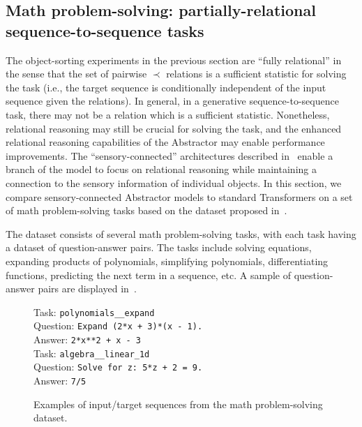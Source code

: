\subsection{Math problem-solving: partially-relational sequence-to-sequence tasks}\label{ssec:experiments_math}

The object-sorting experiments in the previous section are ``fully relational'' in the sense that the set of pairwise $\prec$ relations is a sufficient statistic for solving the task (i.e., the target sequence is conditionally independent of the input sequence given the relations). In general, in a generative sequence-to-sequence task, there may not be a relation which is a sufficient statistic. Nonetheless, relational reasoning may still be crucial for solving the task, and the enhanced relational reasoning capabilities of the Abstractor may enable performance improvements. The ``sensory-connected'' architectures described in~ enable a branch of the model to focus on relational reasoning while maintaining a connection to the sensory information of individual objects. In this section, we compare sensory-connected Abstractor models to standard Transformers on a set of math problem-solving tasks based on the dataset proposed in~\citep{saxtonAnalyzingMathematicalReasoning2019}.

The dataset consists of several math problem-solving tasks, with each task having a dataset of question-answer pairs. The tasks include solving equations, expanding products of polynomials, simplifying polynomials, differentiating functions, predicting the next term in a sequence, etc. A sample of question-answer pairs are displayed in~.

\begin{figure}
    \begin{minipage}{0.5\textwidth}
        Task: \texttt{polynomials\_\_expand}\\
        Question: \texttt{Expand (2*x + 3)*(x - 1).}\\
        Answer: \texttt{2*x**2 + x - 3}\\

        Task: \texttt{algebra\_\_linear\_1d}\\
        Question: \texttt{Solve for z: 5*z + 2 = 9.}\\
        Answer: \texttt{7/5}\\
    \end{minipage}
    \caption{Examples of input/target sequences from the math problem-solving dataset.}\label{fig:math_dataset}
\end{figure}



